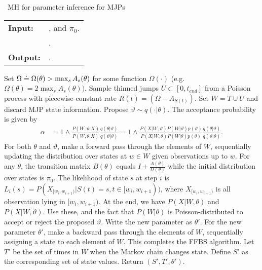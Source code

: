 \begin{algorithm}[H]
   \caption{\Naive\  MH for parameter inference for MJPs }
   \label{alg:MH_naive}
  \begin{tabular}{l l}
   \textbf{Input:  } & \text{Observations $X$}, 
                       \text{the MJP path $S(t) = (S, T)$, the  parameters $\theta$ }and $\pi_0$.\\ 
                     & \text{A  Metropolis-Hasting proposal $q(\cdot | \theta)$}.\\
   \textbf{Output:  }& \text{A new MJP trajectory $S'(t) = (S', T')$, 
                            new MJP parameters $\theta'$}.\\
   \hline
   \end{tabular}
   \begin{algorithmic}[1]
     \State Set $\Omega \doteq \Omega(\theta) > \max_s{A_s(\theta)}$ for
     some function $\Omega(\cdot)$ (e.g.\ $\Omega(\theta) = 
      2\max_s A_s(\theta))$.
      \State Sample thinned jumps $U\subset[0, t_{end}]$ from a 
      Poisson process with piecewise-constant rate 
      $R(t) = (\Omega - A_{S(t)})$. 
    Set $W = T \cup U$ and discard MJP state information.
      \State Propose $\vartheta \sim q(\cdot| \theta)$.
          The acceptance probability is given by 
          \vspace{-.05in}
          \begin{align*}
          \alpha &=  1 \wedge \frac{P(W,\vartheta| X)}{P(W, \theta| X)} \frac{q(\theta|\vartheta)}{q(\vartheta|\theta)}
          =  1 \wedge \frac{P(X| W,\vartheta) P(W | \vartheta)p(\vartheta)}
            {P(X|W, \theta)P(W | \theta)p(\theta)} \frac{q(\theta|\vartheta)}{q(\vartheta|\theta)}.
          \end{align*}
          \vspace{-.1in}
    \State For both $\theta$ and $\vartheta$, make a forward pass through the 
    elements of $W$, sequentially updating the distribution over states at 
    $w \in W$ given observations up to $w$. 
    For any $\theta$, the transition matrix 
    $B(\theta)$ equals $I + \frac{A(\theta)}{\Omega(\theta)}$ while the initial distribution
      over states is $\pi_0$. The likelihood of state $s$ at step $i$ is 
      $ L_i(s) = P(X_{[w_i, w_{i + 1})} | S(t) = s , t \in [w_i, w_{i + 1})) 
      $, where $X_{[w_i,w_{i+1})}$ is all observation lying in 
      $[w_i,w_{i+1})$. %
    At the end, we have 
    $P(X|W,\theta)$ and $P(X|W,\vartheta)$. Use these, and the fact that 
    $P(W|\theta)$ is Poisson-distributed to accept or reject the
    proposed $\vartheta$. Write the new parameter as $\theta'$.
    \State For the new parameter $\theta'$, make a backward pass through 
    the elements of
    $W$, sequentially assigning a state to each element of $W$. This
    completes the FFBS algorithm.
    \State Let $T'$ be the set of times in $W$ when the Markov chain changes state. Define $S'$ as the corresponding set of state values. Return $(S', T', \theta')$.
\end{algorithmic}
\end{algorithm}
\vspace{-.32in}

